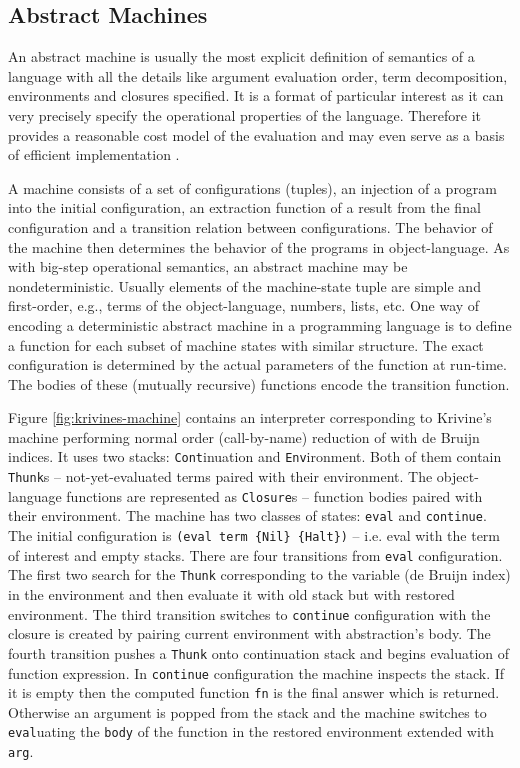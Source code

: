 \subsection*{Abstract Machines}
% 
An abstract machine \cite{landin-secd} is usually the most explicit definition of semantics of a language with all the details like argument evaluation order, term decomposition, environments and closures specified.
It is a format of particular interest as it can very precisely specify the operational properties of the language.
Therefore it provides a reasonable cost model of the evaluation and may even serve as a basis of efficient implementation \cite{leroy-zinc}.

A machine consists of a set of configurations (tuples), an injection of a program into the initial configuration, an extraction function of a result from the final configuration and a transition relation between configurations.
The behavior of the machine then determines the behavior of the programs in object-language.
As with big-step operational semantics, an abstract machine may be nondeterministic.
Usually elements of the machine-state tuple are simple and first-order, e.g., terms of the object-language, numbers, lists, etc.
One way of encoding a deterministic abstract machine in a programming language is to define a function for each subset of machine states with similar structure.
The exact configuration is determined by the actual parameters of the function at run-time.
The bodies of these (mutually recursive) functions encode the transition function.

Figure \ref{fig:krivines-machine} contains an interpreter corresponding to Krivine's machine \cite{krivine-machine} performing normal order (call-by-name) reduction of \LC{} with de Bruijn indices.
It uses two stacks: \lstinline!Cont!inuation and \lstinline!Env!ironment.
Both of them contain \lstinline!Thunk!s -- not-yet-evaluated terms paired with their environment.
The object-language functions are represented as \lstinline!Closure!s -- function bodies paired with their environment.
The machine has two classes of states: \lstinline!eval! and \lstinline!continue!.
The initial configuration is \lstinline!(eval term {Nil} {Halt})! -- i.e. eval with the term of interest and empty stacks.
There are four transitions from \lstinline!eval! configuration.
The first two search for the \lstinline!Thunk! corresponding to the variable (de Bruijn index) in the environment and then evaluate it with old stack but with restored environment.
The third transition switches to \lstinline!continue! configuration with the closure is created by pairing current environment with abstraction's body.
The fourth transition pushes a \lstinline!Thunk! onto continuation stack and begins evaluation of function expression.
In \lstinline!continue! configuration the machine inspects the stack.
If it is empty then the computed function \lstinline!fn! is the final answer which is returned.
Otherwise an argument is popped from the stack and the machine switches to \lstinline!eval!uating the \lstinline!body! of the function in the restored environment extended with \lstinline!arg!.

